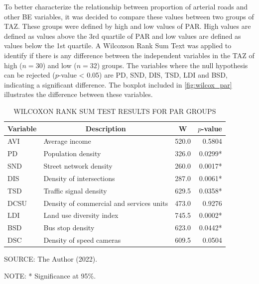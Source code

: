 To better characterize the relationship between proportion of arterial roads and other BE variables, it was decided to compare these values between two groups of TAZ. These groups were defined by high and low values of PAR. High values are defined as values above the 3rd quartile of PAR and low values are defined as values below the 1st quartile. A Wilcoxson Rank Sum Text was applied to identify if there is any difference between the independent variables in the TAZ of high ($n = 30$) and low ($n = 32$) groups. The variables where the null hypothesis can be rejected ($p$-value < 0.05) are PD, SND, DIS, TSD, LDI and BSD, indicating a significant difference. The boxplot included in \autoref{fig:wilcox_par} illustrates the difference between these variables.

\begin{table}
    \footnotesize
    \captionsetup{justification=raggedright,
        singlelinecheck=false,
        font=footnotesize}
    \caption{WILCOXON RANK SUM TEST RESULTS FOR PAR GROUPS}
    \centering
    \begin{tabular}{llrr}
        \hline
        \multicolumn{1}{c}{\textbf{Variable}} & \multicolumn{1}{c}{\textbf{Description}} & \multicolumn{1}{c}{\textbf{W}} & \multicolumn{1}{c}{\textbf{$p$-value}} \\
        \hline
        AVI  & Average income                           & 520.0 & 0.5804  \\
        PD   & Population density                       & 326.0 & 0.0299* \\
        SND  & Street network density                   & 260.0 & 0.0017* \\
        DIS  & Density of intersections                 & 287.0 & 0.0061* \\
        TSD  & Traffic signal density                   & 629.5 & 0.0358* \\
        DCSU & Density of commercial and services units & 473.0 & 0.9276  \\
        LDI  & Land use diversity index                 & 745.5 & 0.0002* \\
        BSD  & Bus stop density                         & 623.0 & 0.0442* \\
        DSC  & Density of speed cameras                 & 609.5 & 0.0504  \\
        \hline
    \end{tabular}
    \label{tab:wilcox_par}
    \par \vspace{2mm} \footnotesize \raggedright
    SOURCE: The Author (2022).
    \par
    NOTE: * Significance at 95\%.
\end{table}

